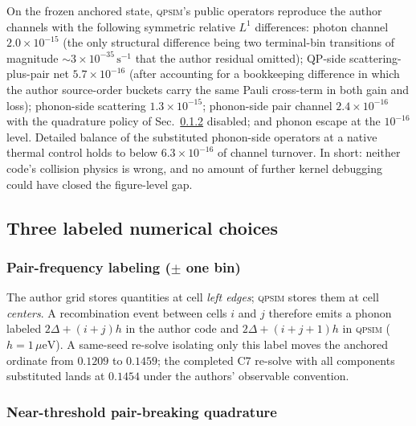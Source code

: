 \documentclass[reprint,amsmath,amssymb,aps,prapplied,nofootinbib]{revtex4-2}
\newcommand{\qpsim}{\textsc{qpsim}}
\newcommand{\ueV}{\,\mu\mathrm{eV}}
\begin{document}
On the frozen anchored state, \qpsim{}'s public operators reproduce the
author channels with the following symmetric relative $L^1$ differences:
photon channel $2.0\times10^{-15}$ (the only structural difference being
two terminal-bin transitions of magnitude $\sim 3\times10^{-35}\,
\mathrm{s}^{-1}$ that the author residual omitted); QP-side
scattering-plus-pair net $5.7\times10^{-16}$ (after accounting for a
bookkeeping difference in which the author source-order buckets carry
the same Pauli cross-term in both gain and loss); phonon-side scattering
$1.3\times10^{-15}$; phonon-side pair channel $2.4\times10^{-16}$ with
the quadrature policy of Sec.~\ref{sec:kaplan} disabled; and phonon
escape at the $10^{-16}$ level.  Detailed balance of the substituted
phonon-side operators at a native thermal control holds to below
$6.3\times10^{-16}$ of channel turnover.  In short: neither code's
collision physics is wrong, and no amount of further kernel debugging
could have closed the figure-level gap.

\subsection{Three labeled numerical choices}

\subsubsection{Pair-frequency labeling ($\pm$ one bin)}

The author grid stores quantities at cell \emph{left edges}; \qpsim{}
stores them at cell \emph{centers}.  A recombination event between cells
$i$ and $j$ therefore emits a phonon labeled $2\Delta + (i+j)h$ in the
author code and $2\Delta + (i+j+1)h$ in \qpsim{} ($h = 1\ueV$).  A
same-seed re-solve isolating only this label moves the anchored ordinate
from $0.1209$ to $0.1459$; the completed C7 re-solve with all components
substituted lands at $0.1454$ under the authors' observable convention.

\subsubsection{Near-threshold pair-breaking quadrature}
\label{sec:kaplan}
\end{document}
